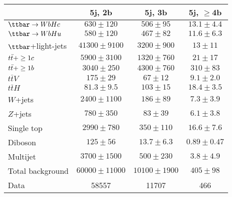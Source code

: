 \begin{table}[htbp]
\begin{center}
\begin{tabular}{l*{3}{c}}
\hline\hline
 & 5j, 2b & 5j, 3b & 5j, $\geq$4b \\
\hline
$\Hc$ & $ 630 \pm 120 $ &   $ 506 \pm 95 $ &   $ 13.1 \pm 4.4 $ \\ 
$\Hu$ & $ 580 \pm 120 $ &   $ 467 \pm 82 $ &   $ 11.6 \pm 6.3 $ \\ 
\hline
$\ttbar$+light-jets & $ 41300 \pm 9100 $ &   $ 3200 \pm 900 $ &   $ 13 \pm 11 $ \\ 
$t\bar{t}+\geq1c$ & $ 5900 \pm 3100 $ &   $ 1320 \pm 760 $ &   $ 21 \pm 17 $ \\ 
$t\bar{t}+\geq1b$ & $ 3040 \pm 250 $ &   $ 4300 \pm 760 $ &   $ 310 \pm 83 $ \\ 
$t\bar{t}V$  &   $ 175 \pm 29 $ &   $ 67 \pm 12 $ &   $ 9.1 \pm 2.0 $ \\ 
$t\bar{t}H$  &   $ 81.3 \pm 9.5 $ &   $ 103 \pm 15 $ &   $ 18.4 \pm 3.5 $ \\ 
$W$+jets  &   $ 2400 \pm 1100 $ &   $ 186 \pm 89 $ &   $ 7.3 \pm 3.9 $ \\ 
$Z$+jets  &   $ 780 \pm 350 $ &   $ 83 \pm 39 $ &   $ 6.1 \pm 3.8 $ \\ 
Single top  &   $ 2990 \pm 780 $ &   $ 350 \pm 110 $ &   $ 16.6 \pm 7.6 $ \\ 
Diboson  &   $ 125 \pm 56 $ &   $ 13.7 \pm 6.3 $ &   $ 0.89 \pm 0.47 $ \\ 
Multijet  &   $ 3700 \pm 1500 $ &   $ 500 \pm 230 $ &   $ 3.8 \pm 4.9 $ \\ 
\hline
Total background &  $ 60000 \pm 11000 $ &   $ 10100 \pm 1900 $ &   $ 405 \pm 98 $ \\
\hline
Data & 58557  & 11707  & 466  \\ 
\hline\hline    
\end{tabular}
\vspace{0.2cm}


\end{center}
\end{table}
